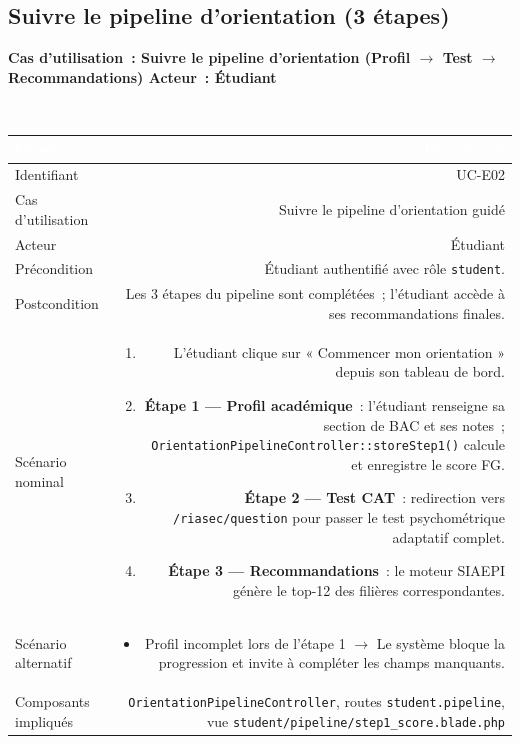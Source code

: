 \documentclass[a4paper,12pt]{article}
\newcommand{\ucheader}[2]{%
  \noindent\colorbox{capblue}{\parbox{\dimexpr\linewidth-2\fboxsep}{%
    \color{white}\bfseries\large Cas d'utilisation~: #1 \hfill \normalsize Acteur~: #2
  }}\\[2pt]
}
\begin{document}
\vspace{1em}

\subsection{Suivre le pipeline d'orientation (3 étapes)}
\ucheader{Suivre le pipeline d'orientation (Profil $\rightarrow$ Test $\rightarrow$ Recommandations)}{Étudiant}

\noindent
\begin{tabular}{|L|R|}
\hline
{}\textcolor{white}{\textbf{Champ}} & \textcolor{white}{\textbf{Description}} \\
\hline
{}Identifiant & UC-E02 \\
\hline
Cas d'utilisation & Suivre le pipeline d'orientation guidé \\
\hline
{}Acteur & Étudiant \\
\hline
Précondition & Étudiant authentifié avec rôle \texttt{student}. \\
\hline
{}Postcondition & Les 3 étapes du pipeline sont complétées~; l'étudiant accède à ses recommandations finales. \\
\hline
Scénario nominal &
\begin{enumerate}
  \item L'étudiant clique sur « Commencer mon orientation » depuis son tableau de bord.
  \item \textbf{Étape 1 --- Profil académique}~: l'étudiant renseigne sa section de BAC et ses notes~; \texttt{OrientationPipelineController::storeStep1()} calcule et enregistre le score FG.
  \item \textbf{Étape 2 --- Test CAT}~: redirection vers \texttt{/riasec/question} pour passer le test psychométrique adaptatif complet.
  \item \textbf{Étape 3 --- Recommandations}~: le moteur SIAEPI génère le top-12 des filières correspondantes.
\end{enumerate} \\
\hline
{}Scénario alternatif &
\begin{itemize}
  \item Profil incomplet lors de l'étape 1 $\rightarrow$ Le système bloque la progression et invite à compléter les champs manquants.
\end{itemize} \\
\hline
Composants impliqués & \texttt{OrientationPipelineController}, routes \texttt{student.pipeline}, vue \texttt{student/pipeline/step1\_score.blade.php} \\
\hline
\end{tabular}
\end{document}
